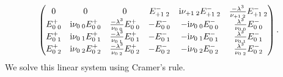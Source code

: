 \documentclass[11pt,reqno,oneside,a4paper]{article}
\begin{document}
\begin{subequations}
\begin{equation}
\begin{pmatrix}
    0 & 0 & 0 & E_{+1\;2}^{-} & \mathrm{i}\nu_{+1\;2}E_{+1\;2}^{-} & \frac{-\lambda^3}{\nu_{+1\;2}}E_{+1\;2}^{-} \\
    E_{0\;0}^{+} & \mathrm{i}\nu_{0\;0}E_{0\;0}^{+} & \frac{-\lambda^3}{\nu_{0\;0}}E_{0\;0}^{+} &
        -E_{0\;0}^{-} & -\mathrm{i}\nu_{0\;0}E_{0\;0}^{-} & \frac{\lambda^3}{\nu_{0\;0}}E_{0\;0}^{-} \\
    E_{0\;1}^{+} & \mathrm{i}\nu_{0\;1}E_{0\;1}^{+} & \frac{-\lambda^3}{\nu_{0\;1}}E_{0\;1}^{+} &
        -E_{0\;1}^{-} & -\mathrm{i}\nu_{0\;1}E_{0\;1}^{-} & \frac{\lambda^3}{\nu_{0\;1}}E_{0\;1}^{-} \\
    E_{0\;2}^{+} & \mathrm{i}\nu_{0\;2}E_{0\;2}^{+} & \frac{-\lambda^3}{\nu_{0\;2}}E_{0\;2}^{+} &
        -E_{0\;2}^{-} & -\mathrm{i}\nu_{0\;2}E_{0\;2}^{-} & \frac{\lambda^3}{\nu_{0\;2}}E_{0\;2}^{-}
    \end{pmatrix}.
\end{equation}
\end{subequations}
We solve this linear system using Cramer's rule.


{\small}
\end{document}

